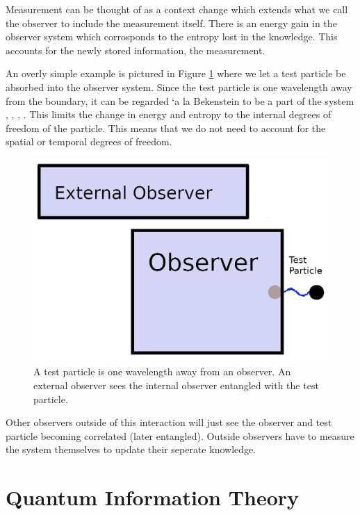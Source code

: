 \documentclass[12pt,a4paper]{article}
\theoremstyle{myrule}
\theoremstyle{postulate}
\theoremstyle{definition}
\begin{document}
Measurement can be thought of as a context change which extends what we call the observer to include the measurement itself.  There is an energy gain in the observer system which corrosponds to the entropy lost in the knowledge.  This accounts for the newly stored information, the measurement.

An overly simple example is pictured in Figure \ref{context} where we let a test particle be absorbed into the observer system.  Since the test particle is one wavelength away from the boundary, it can be regarded \a`a la Bekenstein to be a part of the system \cite{entropic}, \cite{bekenstein}, \cite{matterchannels}, \cite{thrust}.  This limits the change in energy and entropy to the internal degrees of freedom of the particle.   This means that we do not need to account for the spatial or temporal degrees of freedom.

\begin{figure}[h]
\centering
\includegraphics[scale=1.3]{context_change.png}
\caption{A test particle is one wavelength away from an observer.  An external observer sees the internal observer entangled with the test particle.}
\label{context}
\end{figure}

Other observers outside of this interaction will just see the observer and test particle becoming correlated (later entangled).  Outside observers have to measure the system themselves to update their seperate knowledge.

\section{Quantum Information Theory}
\end{document}

